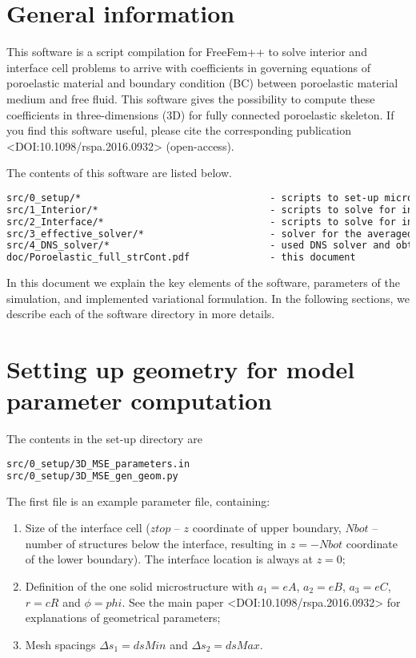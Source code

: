 \documentclass[12pt,a4paper]{article}
\begin{document}
\sloppy

\section{General information}

This software is a script compilation for FreeFem++ to solve interior and interface cell problems to arrive with coefficients in governing equations of poroelastic material and boundary condition (BC) between poroelastic material medium and free fluid. This software gives the possibility to compute these coefficients in three-dimensions (3D) for fully connected poroelastic skeleton. If you find this software useful, please cite the corresponding publication <DOI:10.1098/rspa.2016.0932> (open-access).

The contents of this software are listed below.
\begin{lstlisting}[language=tex]
src/0_setup/*                                 - scripts to set-up microscale geometry
src/1_Interior/*                              - scripts to solve for interior properties
src/2_Interface/*                             - scripts to solve for interface coefficients
src/3_effective_solver/*                      - solver for the averaged fields in the problem
src/4_DNS_solver/*                            - used DNS solver and obtained fields
doc/Poroelastic_full_strCont.pdf              - this document
\end{lstlisting}

In this document we explain the key elements of the software, parameters of the simulation, and implemented variational formulation. In the following sections, we describe each of the software directory in more details.

\section{Setting up geometry for model parameter computation} \label{sec:presim-start}

The contents in the set-up directory are
\begin{lstlisting}[language=tex]
src/0_setup/3D_MSE_parameters.in
src/0_setup/3D_MSE_gen_geom.py
\end{lstlisting}

The first file is an example parameter file, containing:
\begin{enumerate}
    \item Size of the interface cell ($ztop$ -- $z$ coordinate of upper boundary, $Nbot$ -- number of structures below the interface, resulting in $z = - Nbot$ coordinate of the lower boundary). The interface location is always at $z = 0$;
	\item Definition of the one solid microstructure with $a_1 = eA$, $a_2 = eB$, $a_3 = eC$, $r = cR$ and $\phi = phi$. See the main paper <DOI:10.1098/rspa.2016.0932> for explanations of geometrical parameters;
    \item Mesh spacings $\Delta s_1 = dsMin$ and $\Delta s_2 = dsMax$.
\end{enumerate}
\end{document}
